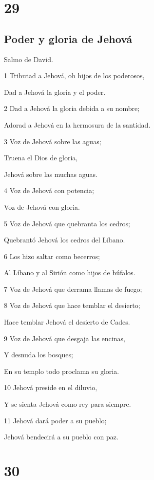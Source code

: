 \chapter{29}

\section*{Poder y gloria de Jehová}

\par Salmo de David.

\par 1 Tributad a Jehová, oh hijos de los poderosos,
\par Dad a Jehová la gloria y el poder.
\par 2 Dad a Jehová la gloria debida a su nombre;
\par Adorad a Jehová en la hermosura de la santidad.
\par 3 Voz de Jehová sobre las aguas;
\par Truena el Dios de gloria,
\par Jehová sobre las muchas aguas.
\par 4 Voz de Jehová con potencia;
\par Voz de Jehová con gloria.
\par 5 Voz de Jehová que quebranta los cedros;
\par Quebrantó Jehová los cedros del Líbano.
\par 6 Los hizo saltar como becerros;
\par Al Líbano y al Sirión como hijos de búfalos.
\par 7 Voz de Jehová que derrama llamas de fuego;
\par 8 Voz de Jehová que hace temblar el desierto;
\par Hace temblar Jehová el desierto de Cades.
\par 9 Voz de Jehová que desgaja las encinas,
\par Y desnuda los bosques;
\par En su templo todo proclama su gloria.
\par 10 Jehová preside en el diluvio,
\par Y se sienta Jehová como rey para siempre.
\par 11 Jehová dará poder a su pueblo;
\par Jehová bendecirá a su pueblo con paz.

\chapter{30}

